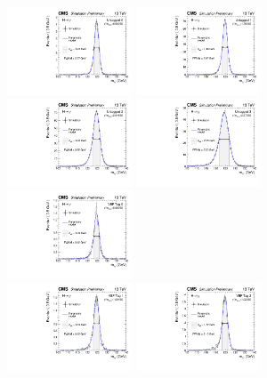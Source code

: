 \begin{figure}[ht!]
\centering
\includegraphics[width=0.33\textwidth]{modellingFigures/DCBpG/UntaggedTag_0.pdf} 
\includegraphics[width=0.33\textwidth]{modellingFigures/DCBpG/UntaggedTag_1.pdf} \\
\includegraphics[width=0.33\textwidth]{modellingFigures/DCBpG/UntaggedTag_2.pdf} 
\includegraphics[width=0.33\textwidth]{modellingFigures/DCBpG/UntaggedTag_3.pdf} \\ 
\includegraphics[width=0.33\textwidth]{modellingFigures/DCBpG/VBFTag_0.pdf}\\  
\includegraphics[width=0.33\textwidth]{modellingFigures/DCBpG/VBFTag_1.pdf} 
\includegraphics[width=0.33\textwidth]{modellingFigures/DCBpG/VBFTag_2.pdf} 


\end{figure}
